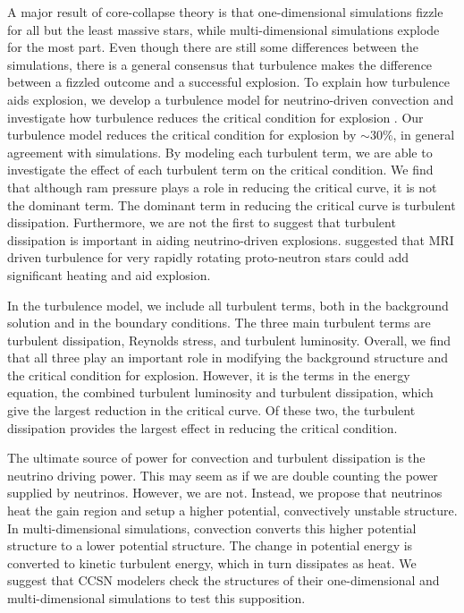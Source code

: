 \documentclass[twocolumn]{aastex6}
\begin{document}
A major result of core-collapse theory is
that one-dimensional simulations fizzle for all but the least
massive stars, while multi-dimensional
  simulations explode for the most part.
  Even though there are still some differences between the
    simulations, there is a general consensus that turbulence makes the difference between a fizzled outcome and a successful
    explosion. To explain how turbulence aids explosion, we
  develop a turbulence model for neutrino-driven convection \citep{murphy13}
  and investigate how turbulence reduces the critical condition for
  explosion \citep{burrows93,murphy17}.   Our turbulence model
  reduces the critical condition for explosion by $\sim$30\%, in general
  agreement with simulations. By modeling each turbulent
    term, we are able to investigate the effect of each turbulent term
  on the critical condition. We find that although ram
  pressure plays a role in reducing the critical curve, it is not the
  dominant term.  The dominant term in reducing the critical curve is
  turbulent dissipation. Furthermore, we are not the first to suggest that turbulent dissipation is important in aiding neutrino-driven explosions.  \citet{thompson05} suggested that MRI driven turbulence for very rapidly rotating proto-neutron stars could add significant heating and aid explosion.

In the turbulence model, we include all turbulent terms, both in the
  background solution and in the boundary conditions.
The three main turbulent terms are turbulent dissipation, Reynolds
stress, and turbulent luminosity. Overall, we find that all three play an important role in modifying the background
  structure and the critical condition for explosion.  However, it is
  the terms in the energy equation, the combined turbulent luminosity and turbulent dissipation, which give the largest reduction in the
  critical curve. Of these two, the turbulent dissipation provides the largest effect
  in reducing the critical condition. 
  
The ultimate source of power for convection and turbulent dissipation
is the neutrino driving power.  This may seem as if we are double
counting the power supplied by neutrinos.  However, we are not.
Instead, we propose that neutrinos heat the gain region and setup a
higher potential, convectively unstable structure.  In
multi-dimensional simulations, convection converts this higher
potential structure to a lower potential structure.  The change in
potential energy is converted to kinetic turbulent energy, which in
turn dissipates as heat.  We suggest that CCSN modelers check the
structures of their one-dimensional and multi-dimensional simulations
to test this supposition.
\end{document}
